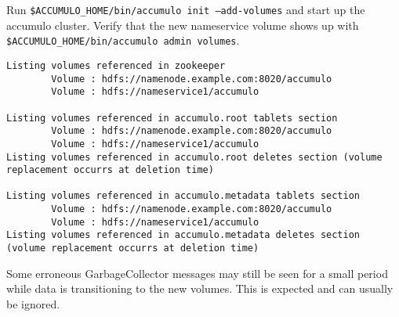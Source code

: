 Run \texttt{\$ACCUMULO\_HOME/bin/accumulo init --add-volumes} and start up the accumulo cluster. Verify that the
new nameservice volume shows up with \texttt{\$ACCUMULO\_HOME/bin/accumulo admin volumes}.

\begingroup\fontsize{8pt}{8pt}\selectfont\begin{verbatim}
Listing volumes referenced in zookeeper
        Volume : hdfs://namenode.example.com:8020/accumulo
        Volume : hdfs://nameservice1/accumulo

Listing volumes referenced in accumulo.root tablets section
        Volume : hdfs://namenode.example.com:8020/accumulo
        Volume : hdfs://nameservice1/accumulo
Listing volumes referenced in accumulo.root deletes section (volume replacement occurrs at deletion time)

Listing volumes referenced in accumulo.metadata tablets section
        Volume : hdfs://namenode.example.com:8020/accumulo
        Volume : hdfs://nameservice1/accumulo
Listing volumes referenced in accumulo.metadata deletes section (volume replacement occurrs at deletion time)
\end{verbatim}

Some erroneous GarbageCollector messages may still be seen for a small period while data is transitioning to
the new volumes. This is expected and can usually be ignored.


